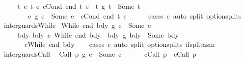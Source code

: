 \begin{isabellebody}
\ \ \ \ \ {\isacharparenleft}{\isasymexists}t{}\ e{}\ t\ e{\isachardot}\ c{}{\isacharequal}Cond\ cnd\ t{}\ e{}\ {\isasymand}\ {\isacharparenleft}t{}\ {\isasyminter}\isactrlsub g\ t{}{\isacharparenright}\ {\isacharequal}\ Some\ t\ {\isasymand}\ \isanewline
\ \ \ \ \ \ \ \ {\isacharparenleft}e{}\ {\isasyminter}\isactrlsub g\ e{}{\isacharparenright}\ {\isacharequal}\ Some\ e\ {\isasymand}\ c{\isacharequal}Cond\ cnd\ t\ e{\isacharparenright}{\isachardoublequoteclose}\ \ \isanewline
%
\isadelimproof
\ \ %
\endisadelimproof
%
\isatagproof
{}\isamarkupfalse%
\ {\isacharparenleft}cases\ c{}{\isacharparenright}\ {\isacharparenleft}auto\ split{\isacharcolon}\ option{\isachardot}splits{\isacharparenright}%
\endisatagproof
{\isafoldproof}%
%
\isadelimproof
\isanewline
%
\endisadelimproof
\isanewline
{}\isamarkupfalse%
\ inter{\isacharunderscore}guards{\isacharunderscore}While{\isacharcolon}\isanewline
\ {\isachardoublequoteopen}{\isacharparenleft}While\ cnd\ bdy{}\ {\isasyminter}\isactrlsub g\ c{}{\isacharparenright}\ {\isacharequal}\ Some\ c\ {\isacharequal}\isanewline
\ \ \ \ \ {\isacharparenleft}{\isasymexists}bdy{}\ bdy{\isachardot}\ c{}\ {\isacharequal}While\ cnd\ bdy{}\ {\isasymand}\ {\isacharparenleft}bdy{}\ {\isasyminter}\isactrlsub g\ bdy{}{\isacharparenright}\ {\isacharequal}\ Some\ bdy\ {\isasymand}\isanewline
\ \ \ \ \ \ \ c{\isacharequal}While\ cnd\ bdy{\isacharparenright}{\isachardoublequoteclose}\isanewline
%
\isadelimproof
\ \ %
\endisadelimproof
%
\isatagproof
{}\isamarkupfalse%
\ {\isacharparenleft}cases\ c{}{\isacharparenright}\ {\isacharparenleft}auto\ split{\isacharcolon}\ option{\isachardot}splits\ if{\isacharunderscore}split{\isacharunderscore}asm{\isacharparenright}%
\endisatagproof
{\isafoldproof}%
%
\isadelimproof
\isanewline
%
\endisadelimproof
\isanewline
{}\isamarkupfalse%
\ inter{\isacharunderscore}guards{\isacharunderscore}Call{\isacharcolon}\isanewline
\ \ {\isachardoublequoteopen}{\isacharparenleft}Call\ p\ {\isasyminter}\isactrlsub g\ c{}{\isacharparenright}\ {\isacharequal}\ Some\ c\ {\isacharequal}\isanewline
\ \ \ \ \ {\isacharparenleft}c{}{\isacharequal}Call\ p\ {\isasymand}\ c{\isacharequal}Call\ p{\isacharparenright}{\isachardoublequoteclose}\isanewline
%
\isadelimproof
\ \ %
\endisadelimproof
%
\isatagproof
{}\isamarkupfalse%

\end{isabellebody}
